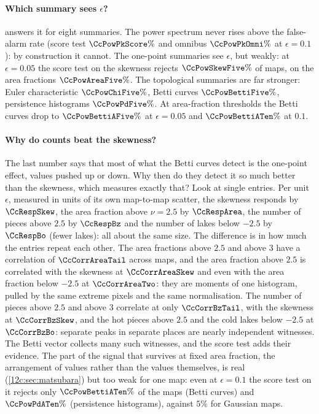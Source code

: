 \paragraph{Which summary sees $\epsilon$?}  answers it for eight summaries. The power spectrum never
rises above the false-alarm rate (score test $\CcPowPkScore\%$ and omnibus $\CcPowPkOmni\%$ at $\epsilon=0.1$): by construction it
cannot. The one-point summaries see $\epsilon$, but weakly: at $\epsilon=0.05$ the score test on the skewness rejects
$\CcPowSkewFive\%$ of maps, on the area fractions $\CcPowAreaFive\%$. The topological summaries are far stronger: Euler
characteristic $\CcPowChiFive\%$, Betti curves $\CcPowBettiFive\%$, persistence histograms $\CcPowPdFive\%$. At area-fraction
thresholds the Betti curves drop to $\CcPowBettiAFive\%$ at $\epsilon=0.05$ and $\CcPowBettiATen\%$ at $0.1$.

\paragraph{Why do counts beat the skewness?} The last number says that most of what the Betti curves detect is the one-point
effect, values pushed up or down. Why then do they detect it so much better than the skewness, which measures exactly that? Look
at single entries. Per unit $\epsilon$, measured in units of its own map-to-map scatter, the skewness responds by $\CcRespSkew$,
the area fraction above $\nu=2.5$ by $\CcRespArea$, the number of pieces above $2.5$ by $\CcRespBz$ and the number of lakes
below $-2.5$ by $\CcRespBo$ (fewer lakes): all about the same size. The difference is in how much the entries repeat each other. The area fractions
above $2.5$ and above $3$ have a correlation of $\CcCorrAreaTail$ across maps, and the area fraction above $2.5$ is correlated
with the skewness at $\CcCorrAreaSkew$ and even with the area fraction below $-2.5$ at $\CcCorrAreaTwo$: they are moments of one
histogram, pulled by the same extreme pixels and the same normalisation. The number of pieces above $2.5$ and above $3$ correlate
at only $\CcCorrBzTail$, with the skewness at $\CcCorrBzSkew$, and the hot pieces above $2.5$ and the cold lakes below $-2.5$ at
$\CcCorrBzBo$: separate peaks in separate places are nearly independent witnesses. The Betti vector collects many such
witnesses, and the score test adds their evidence. The part of the signal that survives at fixed area fraction, the
arrangement of values rather than the values themselves, is real (\cref{12c:sec:matsubara}) but too weak for
one map: even at $\epsilon=0.1$ the score test on it rejects only $\CcPowBettiATen\%$ of the maps (Betti curves) and
$\CcPowPdATen\%$ (persistence histograms), against $5\%$ for Gaussian maps.

